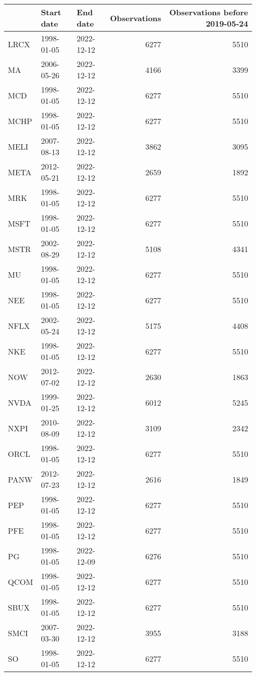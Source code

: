 \begin{table}[ht]
\centering
\begin{tabular}{lllrr}
  \hline
 & Start date & End date & Observations & Observations before 2019-05-24 \\ 
  \hline
LRCX & 1998-01-05 & 2022-12-12 & 6277 & 5510 \\ 
  MA & 2006-05-26 & 2022-12-12 & 4166 & 3399 \\ 
  MCD & 1998-01-05 & 2022-12-12 & 6277 & 5510 \\ 
  MCHP & 1998-01-05 & 2022-12-12 & 6277 & 5510 \\ 
  MELI & 2007-08-13 & 2022-12-12 & 3862 & 3095 \\ 
  META & 2012-05-21 & 2022-12-12 & 2659 & 1892 \\ 
  MRK & 1998-01-05 & 2022-12-12 & 6277 & 5510 \\ 
  MSFT & 1998-01-05 & 2022-12-12 & 6277 & 5510 \\ 
  MSTR & 2002-08-29 & 2022-12-12 & 5108 & 4341 \\ 
  MU & 1998-01-05 & 2022-12-12 & 6277 & 5510 \\ 
  NEE & 1998-01-05 & 2022-12-12 & 6277 & 5510 \\ 
  NFLX & 2002-05-24 & 2022-12-12 & 5175 & 4408 \\ 
  NKE & 1998-01-05 & 2022-12-12 & 6277 & 5510 \\ 
  NOW & 2012-07-02 & 2022-12-12 & 2630 & 1863 \\ 
  NVDA & 1999-01-25 & 2022-12-12 & 6012 & 5245 \\ 
  NXPI & 2010-08-09 & 2022-12-12 & 3109 & 2342 \\ 
  ORCL & 1998-01-05 & 2022-12-12 & 6277 & 5510 \\ 
  PANW & 2012-07-23 & 2022-12-12 & 2616 & 1849 \\ 
  PEP & 1998-01-05 & 2022-12-12 & 6277 & 5510 \\ 
  PFE & 1998-01-05 & 2022-12-12 & 6277 & 5510 \\ 
  PG & 1998-01-05 & 2022-12-09 & 6276 & 5510 \\ 
  QCOM & 1998-01-05 & 2022-12-12 & 6277 & 5510 \\ 
  SBUX & 1998-01-05 & 2022-12-12 & 6277 & 5510 \\ 
  SMCI & 2007-03-30 & 2022-12-12 & 3955 & 3188 \\ 
  SO & 1998-01-05 & 2022-12-12 & 6277 & 5510 \\ 

\end{tabular}
\end{table}
